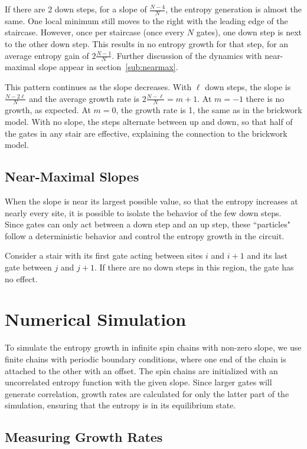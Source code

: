 \documentclass[11pt]{article}
\renewcommand{\l}{\ell}
\begin{document}
If there are 2 down steps, for a slope of $\frac{N-4}{N}$, the entropy generation is almost the same. One local minimum still moves to the right with the leading edge of the staircase. However, once per staircase (once every $N$ gates), one down step is next to the other down step. This results in no entropy growth for that step, for an average entropy gain of $2\frac{N-1}{N}$. Further discussion of the dynamics with near-maximal slope appear in section~\ref{sub:nearmax}.

This pattern continues as the slope decreases. With $\l$ down steps, the slope is $\frac{N-2\l}{N}$ and the average growth rate is $2\frac{N-\l}{N} = m+1$. At $m = -1$ there is no growth, as expected. At $m=0$, the growth rate is 1, the same as in the brickwork model. With no slope, the steps alternate between up and down, so that half of the gates in any stair are effective, explaining the connection to the brickwork model.

\subsection{Near-Maximal Slopes} \emph{} \label{sub:nearmax}

When the slope is near its largest possible value, so that the entropy increases at nearly every site, it is possible to isolate the behavior of the few down steps. Since gates can only act between a down step and an up step, these ``particles" follow a deterministic behavior and control the entropy growth in the circuit.

Consider a stair with its first gate acting between sites $i$ and $i+1$ and its last gate between $j$ and $j+1$. If there are no down steps in this region, the gate has no effect. 

\section{Numerical Simulation} \label{sec:num}

To simulate the entropy growth in infinite spin chains with non-zero slope, we use finite chains with periodic boundary conditions, where one end of the chain is attached to the other with an offset. The spin chains are initialized with an uncorrelated entropy function with the given slope. Since larger gates will generate correlation, growth rates are calculated for only the latter part of the simulation, ensuring that the entropy is in its equilibrium state.

\subsection{Measuring Growth Rates} \emph{} \label{sub:growthrates}
\end{document}
